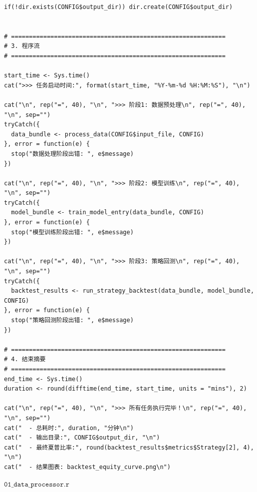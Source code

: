 \documentclass[11pt, a4paper]{article}
\begin{document}
\begin{verbatim}
if(!dir.exists(CONFIG$output_dir)) dir.create(CONFIG$output_dir)


# ============================================================
# 3. 程序流
# ============================================================

start_time <- Sys.time()
cat(">>> 任务启动时间:", format(start_time, "%Y-%m-%d %H:%M:%S"), "\n")

cat("\n", rep("=", 40), "\n", ">>> 阶段1: 数据预处理\n", rep("=", 40), "\n", sep="")
tryCatch({
  data_bundle <- process_data(CONFIG$input_file, CONFIG)
}, error = function(e) {
  stop("数据处理阶段出错: ", e$message)
})

cat("\n", rep("=", 40), "\n", ">>> 阶段2: 模型训练\n", rep("=", 40), "\n", sep="")
tryCatch({
  model_bundle <- train_model_entry(data_bundle, CONFIG)
}, error = function(e) {
  stop("模型训练阶段出错: ", e$message)
})

cat("\n", rep("=", 40), "\n", ">>> 阶段3: 策略回测\n", rep("=", 40), "\n", sep="")
tryCatch({
  backtest_results <- run_strategy_backtest(data_bundle, model_bundle, CONFIG)
}, error = function(e) {
  stop("策略回测阶段出错: ", e$message)
})

# ============================================================
# 4. 结束摘要
# ============================================================
end_time <- Sys.time()
duration <- round(difftime(end_time, start_time, units = "mins"), 2)

cat("\n", rep("=", 40), "\n", ">>> 所有任务执行完毕！\n", rep("=", 40), "\n", sep="")
cat("  - 总耗时:", duration, "分钟\n")
cat("  - 输出目录:", CONFIG$output_dir, "\n")
cat("  - 最终夏普比率:", round(backtest_results$metrics$Strategy[2], 4), "\n")
cat("  - 结果图表: backtest_equity_curve.png\n")   
\end{verbatim}
$\texttt{01\_data\_processor.r}$
\end{document}
